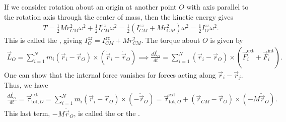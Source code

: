 If we consider rotation about an origin at another point $O$ with axis parallel to the rotation axis through the center of mass, then the kinetic energy gives
\begin{align}
    T = \frac{1}{2} M r_{CM}^{2} \omega^{2} + \frac{1}{2} I_{CM}^{zz} \omega^{2} = \frac{1}{2} (I_{CM}^{zz} + M r_{CM}^{2}) \omega^{2} = \frac{1}{2} I_{O}^{zz} \omega^{2}.
\end{align}
This is called the , giving $I_{O}^{zz} = I_{CM}^{zz} + M r_{CM}^{2}$. The torque about $O$ is given by
\begin{align}
    \vec{L}_{O} = \sum_{i=1}^{N} m_{i}(\vec{r}_{i} - \vec{r}_{O}) \times (\dot{\vec{r}}_{i} - \dot{\vec{r}}_{O}) \implies \frac{d \vec{L}_{O}}{dt} = \sum_{i=1}^{N} (\vec{r}_{i} - \vec{r}_{O}) \times (\vec{F}_{i}^{\text{ext}} + \vec{F}_{i}^{\text{int}}).
\end{align}
One can show that the internal force vanishes for forces acting along $\vec{r}_{i} - \vec{r}_{j}$. Thus, we have
\begin{align}
    \frac{d \vec{L}_{O}}{dt} = \vec{\tau}_{\text{tot},O}^{\text{ext}} = \sum_{i=1}^{N} m_{i}(\vec{r}_{i}-\vec{r}_{O}) \times (-\ddot{\vec{r}}_{O}) = \vec{\tau}_{\text{tot},O}^{\text{ext}} + (\vec{r}_{CM} - \vec{r}_{O}) \times (-M \ddot{\vec{r}}_{O}).
\end{align}
This last term, $-M\ddot{\vec{r}}_{O}$, is called the  or the .